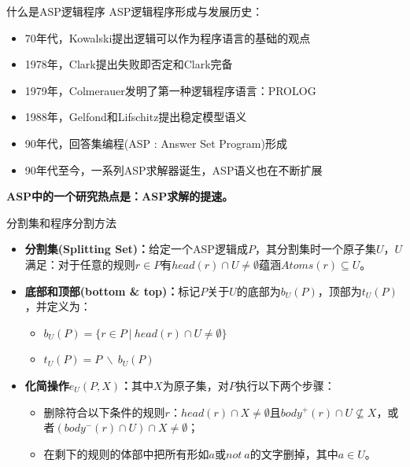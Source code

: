 \documentclass{beamer}
\begin{document}
\begin{frame}[t]{什么是ASP逻辑程序}
	ASP逻辑程序形成与发展历史：
	\begin{itemize}
		\item 70年代，Kowalski提出逻辑可以作为程序语言的基础的观点
		\item 1978年，Clark提出失败即否定和Clark完备
		\item 1979年，Colmerauer发明了第一种逻辑程序语言：PROLOG
		\item 1988年，Gelfond和Lifschitz提出稳定模型语义
		\item 90年代，回答集编程(ASP : Answer Set Program)形成
		\item 90年代至今，一系列ASP求解器诞生，ASP语义也在不断扩展
	\end{itemize}
	

	\textbf{ASP中的一个研究热点是：ASP求解的提速。}
	
\end{frame}


\begin{frame}[t]{分割集和程序分割方法}
	\begin{itemize}
		\item \textbf{分割集(Splitting Set)：}给定一个ASP逻辑成$P$，其分割集时一个原子集$U$，$U$满足：对于任意的规则$r \in P$有$head(r) \cap U \neq \emptyset$蕴涵$Atoms(r) \subseteq U$。
		\item {\textbf{底部和顶部(bottom \& top)：}标记$P$关于$U$的底部为$b_U(P)$，顶部为$t_U(P)$，并定义为：
			\begin{itemize}
				\item $b_U(P) = \{ r \in P~|~head(r) \cap U \neq \emptyset \}$
				\item $t_U(P) = P~\backslash~b_U(P)$
			\end{itemize}
			}
		\item {\textbf{化简操作$e_U(P,X)$：}其中$X$为原子集，对$P$执行以下两个步骤：
			\begin{itemize}
				\item 删除符合以下条件的规则$r$：$head(r) \cap X \neq \emptyset$且$body^+(r) \cap U \nsubseteq X$，或者$(body^-(r) \cap U) \cap X \neq \emptyset$；
				\item 在剩下的规则的体部中把所有形如$a$或$not~a$的文字删掉，其中$a \in U$。
			\end{itemize}
			}
	\end{itemize}
	
\end{frame}
\end{document}
